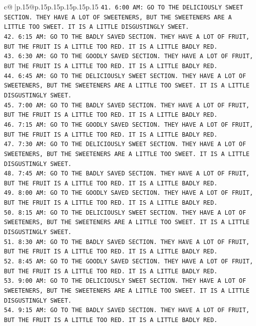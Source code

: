 \documentclass{article}
\begin{document}
{\begin{supertabular}{c@{$\;$}|p{.15\linewidth}@{}p{.15\linewidth}p{.15\linewidth}p{.15\linewidth}p{.15\linewidth}p{.15\linewidth}}
{{{\texttt{41. 6:00 AM: GO TO THE DELICIOUSLY SWEET SECTION. THEY HAVE A LOT OF SWEETENERS, BUT THE SWEETENERS ARE A LITTLE TOO SWEET. IT IS A LITTLE DISGUSTINGLY SWEET.} \\
\texttt{42. 6:15 AM: GO TO THE BADLY SAVED SECTION. THEY HAVE A LOT OF FRUIT, BUT THE FRUIT IS A LITTLE TOO RED. IT IS A LITTLE BADLY RED.} \\
\texttt{43. 6:30 AM: GO TO THE GOODLY SAVED SECTION. THEY HAVE A LOT OF FRUIT, BUT THE FRUIT IS A LITTLE TOO RED. IT IS A LITTLE BADLY RED.} \\
\texttt{44. 6:45 AM: GO TO THE DELICIOUSLY SWEET SECTION. THEY HAVE A LOT OF SWEETENERS, BUT THE SWEETENERS ARE A LITTLE TOO SWEET. IT IS A LITTLE DISGUSTINGLY SWEET.} \\
\texttt{45. 7:00 AM: GO TO THE BADLY SAVED SECTION. THEY HAVE A LOT OF FRUIT, BUT THE FRUIT IS A LITTLE TOO RED. IT IS A LITTLE BADLY RED.} \\
\texttt{46. 7:15 AM: GO TO THE GOODLY SAVED SECTION. THEY HAVE A LOT OF FRUIT, BUT THE FRUIT IS A LITTLE TOO RED. IT IS A LITTLE BADLY RED.} \\
\texttt{47. 7:30 AM: GO TO THE DELICIOUSLY SWEET SECTION. THEY HAVE A LOT OF SWEETENERS, BUT THE SWEETENERS ARE A LITTLE TOO SWEET. IT IS A LITTLE DISGUSTINGLY SWEET.} \\
\texttt{48. 7:45 AM: GO TO THE BADLY SAVED SECTION. THEY HAVE A LOT OF FRUIT, BUT THE FRUIT IS A LITTLE TOO RED. IT IS A LITTLE BADLY RED.} \\
\texttt{49. 8:00 AM: GO TO THE GOODLY SAVED SECTION. THEY HAVE A LOT OF FRUIT, BUT THE FRUIT IS A LITTLE TOO RED. IT IS A LITTLE BADLY RED.} \\
\texttt{50. 8:15 AM: GO TO THE DELICIOUSLY SWEET SECTION. THEY HAVE A LOT OF SWEETENERS, BUT THE SWEETENERS ARE A LITTLE TOO SWEET. IT IS A LITTLE DISGUSTINGLY SWEET.} \\
\texttt{51. 8:30 AM: GO TO THE BADLY SAVED SECTION. THEY HAVE A LOT OF FRUIT, BUT THE FRUIT IS A LITTLE TOO RED. IT IS A LITTLE BADLY RED.} \\
\texttt{52. 8:45 AM: GO TO THE GOODLY SAVED SECTION. THEY HAVE A LOT OF FRUIT, BUT THE FRUIT IS A LITTLE TOO RED. IT IS A LITTLE BADLY RED.} \\
\texttt{53. 9:00 AM: GO TO THE DELICIOUSLY SWEET SECTION. THEY HAVE A LOT OF SWEETENERS, BUT THE SWEETENERS ARE A LITTLE TOO SWEET. IT IS A LITTLE DISGUSTINGLY SWEET.} \\
\texttt{54. 9:15 AM: GO TO THE BADLY SAVED SECTION. THEY HAVE A LOT OF FRUIT, BUT THE FRUIT IS A LITTLE TOO RED. IT IS A LITTLE BADLY RED.} \\
}}}
\end{supertabular}}
\end{document}
